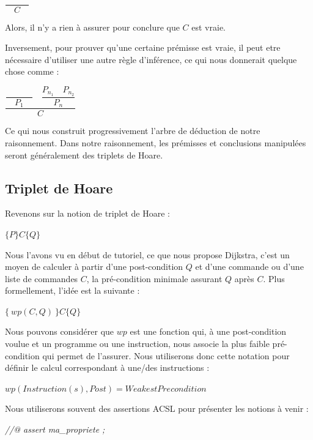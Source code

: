 \documentclass[12pt,francais,]{scrbook}
\newenvironment{Shaded}{}{}
\newcommand{\CommentTok}[1]{\textcolor[rgb]{0.38,0.63,0.69}{\textit{{#1}}}}
\begin{document}
\begin{center} \(\dfrac{}{\quad C \quad}\) \end{center}

Alors, il n'y a rien à assurer pour conclure que \(C\) est vraie.

Inversement, pour prouver qu'une certaine prémisse est vraie, il peut
etre nécessaire d'utiliser une autre règle d'inférence, ce qui nous
donnerait quelque chose comme :

\begin{center}
\(\dfrac{\dfrac{}{\quad P_1\quad} \quad \dfrac{P_{n_1}\quad P_{n_2}}{P_n}}{C}\)
\end{center}

Ce qui nous construit progressivement l'arbre de déduction de notre
raisonnement. Dans notre raisonnement, les prémisses et conclusions
manipulées seront généralement des triplets de Hoare.

\subsection{Triplet de Hoare}\label{triplet-de-hoare}

Revenons sur la notion de triplet de Hoare :

\begin{center} \(\{ P \} C \{ Q \}\) \end{center}

Nous l'avons vu en début de tutoriel, ce que nous propose Dijkstra,
c'est un moyen de calculer à partir d'une post-condition \(Q\) et d'une
commande ou d'une liste de commandes \(C\), la pré-condition minimale
assurant \(Q\) après \(C\). Plus formellement, l'idée est la suivante :

\begin{center} \(\{\ wp(C,Q)\ \} C \{ Q \}\) \end{center}

Nous pouvons considérer que \(wp\) est une fonction qui, à une
post-condition voulue et un programme ou une instruction, nous associe
la plus faible pré-condition qui permet de l'assurer. Nous utiliserons
donc cette notation pour définir le calcul correspondant à une/des
instructions :

\(wp(Instruction(s), Post) = WeakestPrecondition\)

Nous utiliserons souvent des assertions ACSL pour présenter les notions
à venir :

\begin{footnotesize}\begin{Shaded}
\begin{Highlighting}[]
\CommentTok{//@ assert ma_propriete ;}
\end{Highlighting}
\end{Shaded}\end{footnotesize}
\end{document}
